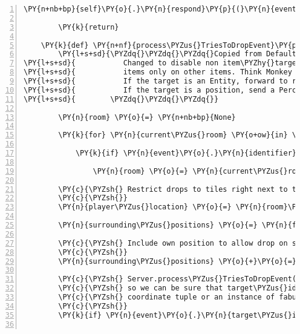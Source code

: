 \begin{Verbatim}[commandchars=\\\{\},numbers=left,firstnumber=1,stepnumber=1]
            \PY{n+nb+bp}{self}\PY{o}{.}\PY{n}{respond}\PY{p}{(}\PY{n}{event}\PY{p}{)}

        \PY{k}{return}

    \PY{k}{def} \PY{n+nf}{process\PYZus{}TriesToDropEvent}\PY{p}{(}\PY{n+nb+bp}{self}\PY{p}{,} \PY{n}{event}\PY{p}{)}\PY{p}{:}
        \PY{l+s+sd}{\PYZdq{}\PYZdq{}\PYZdq{}Copied from DefaultGame.}
\PY{l+s+sd}{           Changed to disable non item\PYZhy{}targets. Game Logic depends on dropping}
\PY{l+s+sd}{           items only on other items. Think Monkey Island.}
\PY{l+s+sd}{           If the target is an Entity, forward to respond().}
\PY{l+s+sd}{           If the target is a position, send a PerceptionEvent.}
\PY{l+s+sd}{        \PYZdq{}\PYZdq{}\PYZdq{}}

        \PY{n}{room} \PY{o}{=} \PY{n+nb+bp}{None}

        \PY{k}{for} \PY{n}{current\PYZus{}room} \PY{o+ow}{in} \PY{n+nb+bp}{self}\PY{o}{.}\PY{n}{host}\PY{o}{.}\PY{n}{room\PYZus{}by\PYZus{}id}\PY{o}{.}\PY{n}{values}\PY{p}{(}\PY{p}{)}\PY{p}{:}

            \PY{k}{if} \PY{n}{event}\PY{o}{.}\PY{n}{identifier} \PY{o+ow}{in} \PY{n}{current\PYZus{}room}\PY{o}{.}\PY{n}{entity\PYZus{}dict}\PY{o}{.}\PY{n}{keys}\PY{p}{(}\PY{p}{)}\PY{p}{:}

                \PY{n}{room} \PY{o}{=} \PY{n}{current\PYZus{}room}

        \PY{c}{\PYZsh{} Restrict drops to tiles right next to the player.}
        \PY{c}{\PYZsh{}}
        \PY{n}{player\PYZus{}location} \PY{o}{=} \PY{n}{room}\PY{o}{.}\PY{n}{entity\PYZus{}locations}\PY{p}{[}\PY{n}{event}\PY{o}{.}\PY{n}{identifier}\PY{p}{]}

        \PY{n}{surrounding\PYZus{}positions} \PY{o}{=} \PY{n}{fabula}\PY{o}{.}\PY{n}{surrounding\PYZus{}positions}\PY{p}{(}\PY{n}{player\PYZus{}location}\PY{p}{)}

        \PY{c}{\PYZsh{} Include own position to allow drop on self}
        \PY{c}{\PYZsh{}}
        \PY{n}{surrounding\PYZus{}positions} \PY{o}{+}\PY{o}{=} \PY{p}{[}\PY{n}{player\PYZus{}location}\PY{p}{]}

        \PY{c}{\PYZsh{} Server.process\PYZus{}TriesToDropEvent() has already done some checks,}
        \PY{c}{\PYZsh{} so we can be sure that target\PYZus{}identifier is either a valid}
        \PY{c}{\PYZsh{} coordinate tuple or an instance of fabula.Entity.}
        \PY{c}{\PYZsh{}}
        \PY{k}{if} \PY{n}{event}\PY{o}{.}\PY{n}{target\PYZus{}identifier} \PY{o+ow}{in} \PY{n}{room}\PY{o}{.}\PY{n}{entity\PYZus{}dict}\PY{o}{.}\PY{n}{keys}\PY{p}{(}\PY{p}{)}\PY{p}{:}


\end{Verbatim}
